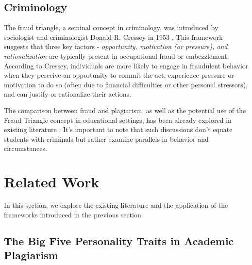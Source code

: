 \subsection{Criminology}
The fraud triangle, a seminal concept in criminology, was introduced by sociologist and criminologist Donald R. Cressey in 1953 \cite{Cressey}. This framework suggests that three key factors - \textit{opportunity, motivation (or pressure), and rationalization} are typically present in occupational fraud or embezzlement. According to Cressey, individuals are more likely to engage in fraudulent behavior when they perceive an opportunity to commit the act, experience pressure or motivation to do so (often due to financial difficulties or other personal stressors), and can justify or rationalize their actions. 

The comparison between fraud and plagiarism, as well as the potential use of the Fraud Triangle concept in educational settings, has been already explored in existing literature \cite{fraudTriangleToAcadmics, FraudTriEffect}. It's important to note that such discussions don't equate students with criminals but rather examine parallels in behavior and circumstances.


\section{Related Work} \label{sec:relatedwork}
In this section, we explore the existing literature and the application of the frameworks introduced in the previous section.

\subsection{The Big Five Personality Traits in Academic Plagiarism}

